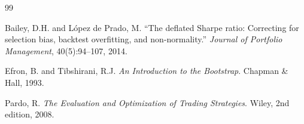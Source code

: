 \documentclass[11pt,a4paper]{article}
\begin{document}

\begin{thebibliography}{99}

Bailey, D.H. and L\'{o}pez de Prado, M.
``The deflated Sharpe ratio: Correcting for selection bias, backtest overfitting, and non-normality.''
\emph{Journal of Portfolio Management}, 40(5):94--107, 2014.

Efron, B. and Tibshirani, R.J.
\emph{An Introduction to the Bootstrap}.
Chapman \& Hall, 1993.

Pardo, R.
\emph{The Evaluation and Optimization of Trading Strategies}.
Wiley, 2nd edition, 2008.

\end{thebibliography}
\end{document}
